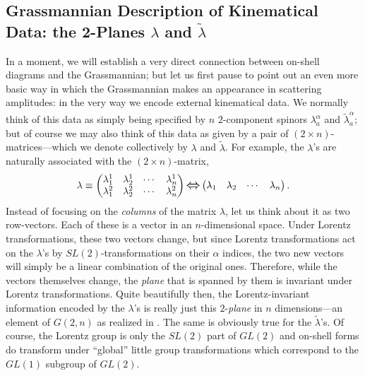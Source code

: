 \documentclass[12pt,hyperref,compress]{JHEP3}
\newcommand{\eq}[1]{\begin{equation}#1\end{equation}}
\begin{document}
\subsection{Grassmannian Description of Kinematical Data: the 2-Planes $\lambda$ and $\tilde{\lambda}$}
In a moment, we will establish a very direct connection between on-shell diagrams and the Grassmannian; but let us first pause to point out an even more basic way in which the Grassmannian makes an appearance in scattering amplitudes: in the very way we encode external kinematical data. We normally think of this data as simply being specified by $n$ $2$-component spinors $\lambda_a^{\alpha}$ and $\widetilde \lambda_a^{\dot{\alpha}}$; but of course we may also think of this data as given by a pair of $(2\!\times\!n)$-matrices---which we denote collectively by $\lambda$ and $\widetilde\lambda$. For example, the $\lambda$'s are naturally associated with the $(2\!\times\!n)$-matrix, \vspace{-.2cm}\eq{\lambda\equiv\left(\begin{array}{@{}cccc@{}}\lambda_1^1&\lambda_2^1&\cdots&\lambda^1_n\\\lambda_1^2&\lambda_2^2&\cdots&\lambda^2_n\end{array}\right)\raisebox{-.75pt}{\text{{\Large$\Leftrightarrow$}}}\left(\begin{array}{@{}cccc@{}}\lambda_1&\lambda_2&\cdots&\lambda_n\end{array}\right).\vspace{-.2cm}} Instead of focusing on the {\it columns} of the matrix $\lambda$, let us think about it as two row-vectors. Each of these is a vector in an $n$-dimensional space. Under Lorentz transformations, these two vectors change, but since Lorentz transformations act on the $\lambda$'s by $SL(2)$-transformations on their $\alpha$ indices, the two new vectors will simply be a linear combination of the original ones. Therefore, while the vectors themselves change, the {\it plane} that is spanned by them is invariant under Lorentz transformations. Quite beautifully then, the Lorentz-invariant information encoded by the $\lambda$'s is really just this $2$-{\it plane} in $n$ dimensions---an element of $G(2,n)$ as realized in \cite{ArkaniHamed:2009dn}. The same is obviously true for the $\widetilde \lambda$'s. Of course, the Lorentz group is only the $SL(2)$ part of $GL(2)$ and on-shell forms do transform under ``global'' little group transformations which correspond to the $GL(1)$ subgroup of $GL(2)$.
\end{document}
